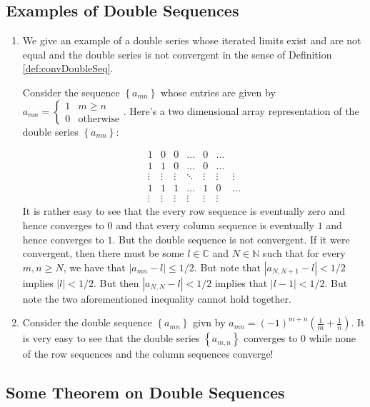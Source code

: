 \documentclass[12pt]{article}
\theoremstyle{definition}
\theoremstyle{remark}
\theoremstyle{plain}
\newcommand{\N}{\mathbb N}
\newcommand{\C}{\mathbb C}
\begin{document}
\subsection{Examples of Double Sequences}

\begin{enumerate}
    \item We give an example of a double series whose iterated limits exist and are not equal and the double series is not convergent in the sense of Definition \ref{def:convDoubleSeq}.

	Consider the sequence $\left\{ a_{mn} \right\}$ whose entries are given by $a_{mn}= \begin{cases} 1 & m\ge n \\ 0 & \text{otherwise} \end{cases}$. Here's a two dimensional array representation of the double series $\left\{ a_{mn} \right\}$:

	$$\begin{matrix}
		1 & 0 & 0 & \ldots & 0 & \ldots \\
		1 & 1 & 0 & \ldots & 0 & \ldots \\
		\vdots & \vdots & \vdots & \ddots & \vdots & \vdots & \vdots \\
1 & 1 & 1 & \ldots & 1 & 0 & \ldots  \\
\vdots & \vdots & \vdots & \vdots & \vdots & \vdots
	\end{matrix}$$
	It is rather easy to see that the every row sequence is eventually zero and hence converges to $0$ and that every column sequence is eventually $1$ and hence converges to $1$. But the double sequence is not convergent. If it were convergent, then there must be some $l\in \C$ and $N\in \N$ such that for every $m,n\ge N$, we have that $|a_{mn}-l|\le 1/2$. But note that $|a_{N, N+1} - l| < 1/2$ implies $|l| < 1/2$. But then $|a_{N,N}-l|<1/2$ implies that $|l-1|<1/2$. But note the two aforementioned inequality cannot hold together. 

    \item Consider the double sequence $\left\{ a_{mn} \right\}$ givn by $a_{mn} = \left( -1 \right)^{ m+n} \left( \frac{1}{m} + \frac{1}{n} \right)$. It is very easy to see that the double series $\left\{ a_{m,n} \right\}$ converges to $0$ while none of the row sequences and the column sequences converge!
\end{enumerate}


\subsection{Some Theorem on Double Sequences}
\end{document}
